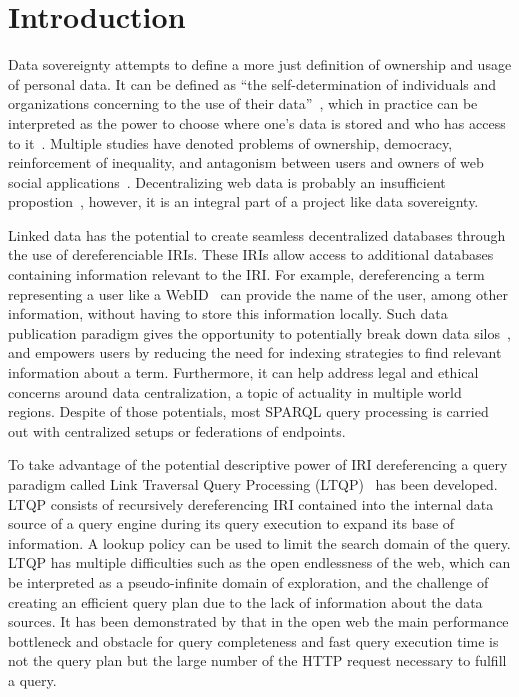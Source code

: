 \section{Introduction}

Data sovereignty attempts to define a more just definition of ownership and usage of personal data.
It can be defined as ``the self-determination of individuals and organizations concerning to the use of their data''~\cite{verstraete2022solid},
which in practice can be interpreted as the power to choose where one's data is stored and who has access to it~\cite{verstraete2022solid}.
Multiple studies have denoted problems of ownership, democracy, reinforcement of inequality, and antagonism between users and owners of web social applications~\cite{Terranova2000FreeLP, Curran2016ch1, Sevignani2013, 9663788}.
Decentralizing web data is probably an insufficient propostion~\cite{9663788, Curran2016ch1}, however, it is an integral part of a project like data sovereignty.

Linked data has the potential to create seamless decentralized databases through the use of dereferenciable IRIs.
These IRIs allow access to additional databases containing information relevant to the IRI.
For example, dereferencing a term representing a user like a WebID~ can provide the name of the user, among other information, without having 
to store this information locally.
Such data publication paradigm gives the opportunity to potentially break down data silos~\cite{verstraete2022solid},
and empowers users by reducing the need for indexing strategies to find relevant information about a term. 
Furthermore, it can help address legal and ethical concerns around data centralization, a topic of actuality in multiple world regions.
Despite of those potentials, most SPARQL query processing is carried out with centralized setups or federations of endpoints.

To take advantage of the potential descriptive power of IRI dereferencing a query paradigm called Link Traversal Query Processing (LTQP)~\cite{Hartig2012} has been developed.
LTQP consists of recursively dereferencing IRI contained into the internal data source of a query engine during its query execution to expand its base of information.
A lookup policy can be used to limit the search domain of the query.
LTQP has multiple difficulties such as the open endlessness of the web, which can be interpreted as a pseudo-infinite domain of exploration,
and the challenge of creating an efficient query plan due to the lack of information about the data sources. 
It has been demonstrated by \citeauthor{hartig2016walking} that in the open web the main performance bottleneck and obstacle for query completeness and fast query execution time is not the query plan but the large number of the HTTP request necessary to fulfill a query.

